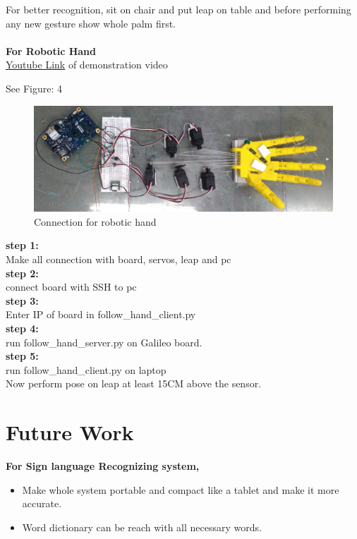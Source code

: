 \documentclass[a4paper,12pt,oneside]{book}
\begin{document}
For better recognition, sit on chair and put leap on table and before performing any new gesture show whole palm first.\\
\vspace{1cm}\\
\textbf{For Robotic Hand}\\
\href{https://youtu.be/T554uLQ0PaI}{Youtube Link} of demonstration video 

See Figure: 4\\

\begin{figure}
  \includegraphics[width=\linewidth]{4.jpg}
  \caption{Connection for robotic hand}
\end{figure}
\textbf{step 1:}\\
Make all connection with board, servos, leap and pc\\
\textbf{step 2:}\\
connect board with SSH to pc\\
\textbf{step 3:}\\
Enter IP of board in follow\_hand\_client.py\\
\textbf{step 4:}\\
run follow\_hand\_server.py on Galileo board.\\
\textbf{step 5:}\\
run follow\_hand\_client.py on laptop\\

Now perform pose on leap at least 15CM above the sensor.


\section{Future Work}
\textbf{For Sign language Recognizing system,}\\
\begin{itemize}
\item Make whole system portable and compact like a tablet and make it more accurate.
\item Word dictionary can be reach with all necessary words.
\end{itemize}
\end{document}
